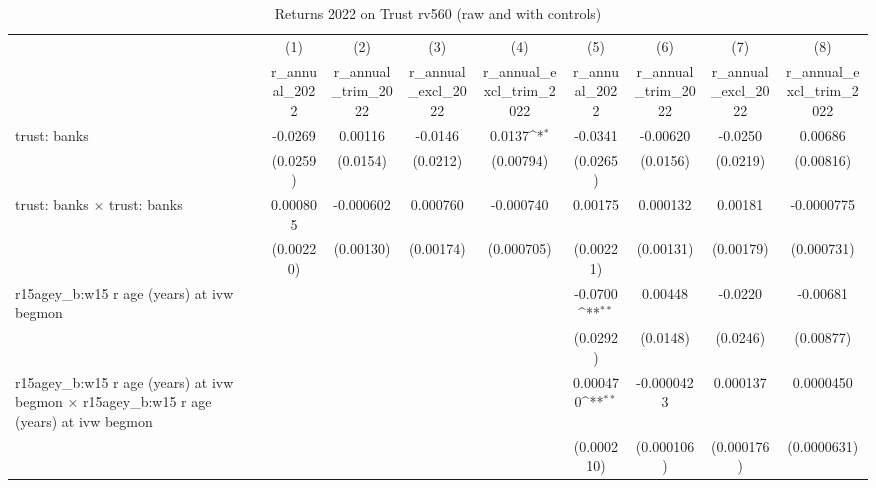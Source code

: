 \begin{table}[htbp]\centering
\def\sym#1{\ifmmode^{#1}\else\(^{#1}\)\fi}
\caption{Returns 2022 on Trust rv560 (raw and with controls)}
\begin{tabular}{l*{8}{c}}
\toprule
                &\multicolumn{1}{c}{(1)}&\multicolumn{1}{c}{(2)}&\multicolumn{1}{c}{(3)}&\multicolumn{1}{c}{(4)}&\multicolumn{1}{c}{(5)}&\multicolumn{1}{c}{(6)}&\multicolumn{1}{c}{(7)}&\multicolumn{1}{c}{(8)}\\
                &\multicolumn{1}{c}{r\_annual\_2022}&\multicolumn{1}{c}{r\_annual\_trim\_2022}&\multicolumn{1}{c}{r\_annual\_excl\_2022}&\multicolumn{1}{c}{r\_annual\_excl\_trim\_2022}&\multicolumn{1}{c}{r\_annual\_2022}&\multicolumn{1}{c}{r\_annual\_trim\_2022}&\multicolumn{1}{c}{r\_annual\_excl\_2022}&\multicolumn{1}{c}{r\_annual\_excl\_trim\_2022}\\
\midrule
trust: banks    &  -0.0269         &  0.00116         &  -0.0146         &   0.0137\sym{*}  &  -0.0341         & -0.00620         &  -0.0250         &  0.00686         \\
                & (0.0259)         & (0.0154)         & (0.0212)         &(0.00794)         & (0.0265)         & (0.0156)         & (0.0219)         &(0.00816)         \\
\addlinespace
trust: banks $\times$ trust: banks& 0.000805         &-0.000602         & 0.000760         &-0.000740         &  0.00175         & 0.000132         &  0.00181         &-0.0000775         \\
                &(0.00220)         &(0.00130)         &(0.00174)         &(0.000705)         &(0.00221)         &(0.00131)         &(0.00179)         &(0.000731)         \\
\addlinespace
r15agey\_b:w15 r age (years) at ivw begmon&                  &                  &                  &                  &  -0.0700\sym{**} &  0.00448         &  -0.0220         & -0.00681         \\
                &                  &                  &                  &                  & (0.0292)         & (0.0148)         & (0.0246)         &(0.00877)         \\
\addlinespace
r15agey\_b:w15 r age (years) at ivw begmon $\times$ r15agey\_b:w15 r age (years) at ivw begmon&                  &                  &                  &                  & 0.000470\sym{**} &-0.0000423         & 0.000137         &0.0000450         \\
                &                  &                  &                  &                  &(0.000210)         &(0.000106)         &(0.000176)         &(0.0000631)         \\

\end{tabular}
\end{table}
